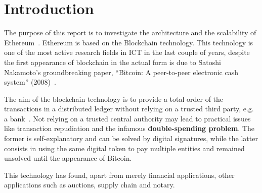 \section*{Introduction}

The purpose of this report is to investigate the architecture and the 
scalability of Ethereum~\cite{wood2018ethereum}. Ethereum is based on the 
Blockchain technology. This technology is one of the most active research
fields in ICT in the last couple of years, despite the first appearance of
blockchain in the actual form is due to Satoshi Nakamoto's groundbreaking 
paper, ``Bitcoin: A peer-to-peer electronic cash system''
(2008)~\cite{bib:bitcoin}. 

The aim of the blockchain technology is to provide a total order of the 
transactions in a distributed ledger without relying on a trusted third party, 
e.g. a bank~\cite{bib:the-quest}. Not relying on a trusted central authority
may lead to practical issues like transaction repudiation and the infamous 
\textbf{double-spending problem}. The former is self-explanatory and can
be solved by digital signatures, while the latter consists in using the same
digital token to pay multiple entities and remained unsolved until the 
appearance of Bitcoin.

This technology has found, apart from merely financial applications, other
applications such as auctions, supply chain and notary.

